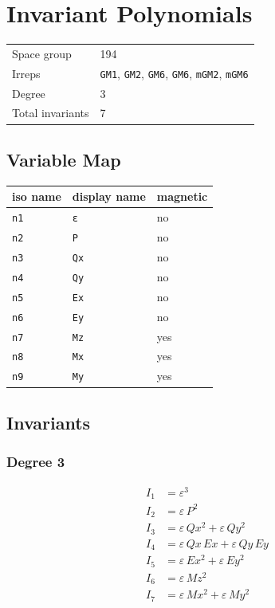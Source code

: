\documentclass{article}
\begin{document}
\section*{Invariant Polynomials}

\begin{tabular}{ll}
\toprule
Space group & 194 \\
Irreps & \texttt{GM1\textplus{}}, \texttt{GM2\textminus{}}, \texttt{GM6\textminus{}}, \texttt{GM6\textminus{}}, \texttt{mGM2\textplus{}}, \texttt{mGM6\textplus{}} \\
Degree & 3 \\
Total invariants & 7 \\
\bottomrule
\end{tabular}

\subsection*{Variable Map}

\begin{tabular}{lll}
\toprule
iso name & display name & magnetic \\
\midrule
\texttt{n1} & \texttt{ε} & no \\
\texttt{n2} & \texttt{P} & no \\
\texttt{n3} & \texttt{Qx} & no \\
\texttt{n4} & \texttt{Qy} & no \\
\texttt{n5} & \texttt{Ex} & no \\
\texttt{n6} & \texttt{Ey} & no \\
\texttt{n7} & \texttt{Mz} & yes \\
\texttt{n8} & \texttt{Mx} & yes \\
\texttt{n9} & \texttt{My} & yes \\
\bottomrule
\end{tabular}

\subsection*{Invariants}

\subsubsection*{Degree 3}

\begin{align*}
I_{1} &= ε^{3} \\
I_{2} &= ε\,P^{2} \\
I_{3} &= ε\,Qx^{2} + ε\,Qy^{2} \\
I_{4} &= ε\,Qx\,Ex + ε\,Qy\,Ey \\
I_{5} &= ε\,Ex^{2} + ε\,Ey^{2} \\
I_{6} &= ε\,Mz^{2} \\
I_{7} &= ε\,Mx^{2} + ε\,My^{2} \\
\end{align*}
\end{document}
